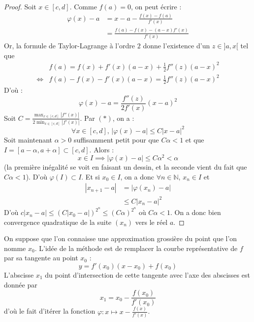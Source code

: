 	\begin{proof}
		Soit $x \in [c, d]$. Comme $f(a) = 0$, on peut écrire :
		\begin{align*}
			\varphi(x) - a &= x - a - \frac{f(x) - f(a)}{f'(x)} \\
			&= \frac{f(a) - f(x) - (a-x)f'(x)}{f'(x)}
		\end{align*}
		Or, la formule de Taylor-Lagrange à l'ordre $2$ donne l'existence d'un $z \in ]a, x[$ tel que
		\begin{align*}
			&f(a) = f(x) + f'(x)(a-x) + \frac{1}{2} f''(z)(a-x)^2 \\
			\iff& f(a) - f(x) - f'(x)(a-x)  = \frac{1}{2} f''(z)(a-x)^2
		\end{align*}
		D'où :
		\[ \varphi(x) - a = \frac{f''(z)}{2f'(x)}(x-a)^2 \tag{$*$} \]
		Soit $C = \frac{\max_{x \in [c, d]} |f''(x)|}{2\min_{x \in [c, d]} |f'(x)|}$. Par $(*)$, on a :
		\[ \forall x \in [c, d], \, |\varphi(x)-a| \leq C |x-a|^2 \]
		Soit maintenant $\alpha > 0$ suffisamment petit pour que $C\alpha < 1$ et que $I = [a - \alpha, a + \alpha] \subset [c, d]$. Alors :
		\[ x \in I \implies |\varphi(x) - a| \leq C\alpha^2 < \alpha \]
		(la première inégalité se voit en faisant un dessin, et la seconde vient du fait que $C\alpha < 1$). D'où $\varphi(I) \subset I$. Et si $x_0 \in I$, on a donc $\forall n \in \mathbb{N}$, $x_n \in I$ et
		\begin{align*}
			|x_{n+1} - a| &= |\varphi(x_n) - a| \\
			&\leq C |x_n - a|^2
		\end{align*}
		D'où $c |x_n - a| \leq (C |x_0 - a|)^{2^n} \leq (C \alpha)^{2^n}$ où $C \alpha < 1$. On a donc bien convergence quadratique de la suite $(x_n)$ vers le réel $a$.
	\end{proof}


	\begin{remark}
		On suppose que l'on connaisse une approximation grossière du point que l'on nomme $x_0$.
		L'idée de la méthode est de remplacer la courbe représentative de $f$ par sa tangente au point $x_0$ :
		\[ y = f'(x_0)(x-x_0) + f(x_0) \]
		L'abscisse $x_1$ du point d'intersection de cette tangente avec l'axe des abscisses est donnée par
		\[ x_1 = x_0 - \frac{f(x_0)}{f'(x_0)} \]
		d'où le fait d'itérer la fonction $\varphi : x \mapsto x - \frac{f(x)}{f'(x)}$.
	\end{remark}


